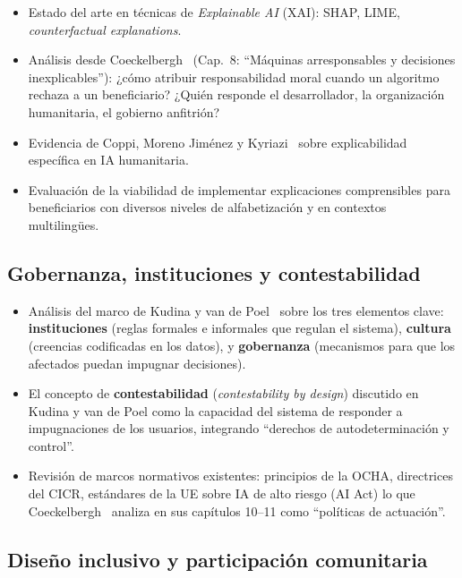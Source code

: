 \documentclass[12pt, a4paper]{article}
\begin{document}
\begin{itemize}[leftmargin=2em]
    \item Estado del arte en técnicas de \textit{Explainable AI} (XAI): SHAP, LIME, \textit{counterfactual explanations}.
    \item Análisis desde Coeckelbergh~\cite{coeckelbergh2021etica} (Cap.~8: ``Máquinas arresponsables y decisiones inexplicables''): ¿cómo atribuir responsabilidad moral cuando un algoritmo rechaza a un beneficiario? ¿Quién responde el desarrollador, la organización humanitaria, el gobierno anfitrión?
    \item Evidencia de Coppi, Moreno Jiménez y Kyriazi~\cite{coppi2021explicability} sobre explicabilidad específica en IA humanitaria.
    \item Evaluación de la viabilidad de implementar explicaciones comprensibles para beneficiarios con diversos niveles de alfabetización y en contextos multilingües.
\end{itemize}

\subsection{Gobernanza, instituciones y contestabilidad}

\begin{itemize}[leftmargin=2em]
    \item Análisis del marco de Kudina y van de Poel~\cite{kudina2024sociotechnical} sobre los tres elementos clave: \textbf{instituciones} (reglas formales e informales que regulan el sistema), \textbf{cultura} (creencias codificadas en los datos), y \textbf{gobernanza} (mecanismos para que los afectados puedan impugnar decisiones).
    \item El concepto de \textbf{contestabilidad} (\textit{contestability by design}) discutido en Kudina y van de Poel como la capacidad del sistema de responder a impugnaciones de los usuarios, integrando ``derechos de autodeterminación y control''.
    \item Revisión de marcos normativos existentes: principios de la OCHA, directrices del CICR, estándares de la UE sobre IA de alto riesgo (AI Act) lo que Coeckelbergh~\cite{coeckelbergh2021etica} analiza en sus capítulos 10--11 como ``políticas de actuación''.
\end{itemize}

\subsection{Diseño inclusivo y participación comunitaria}
\end{document}
